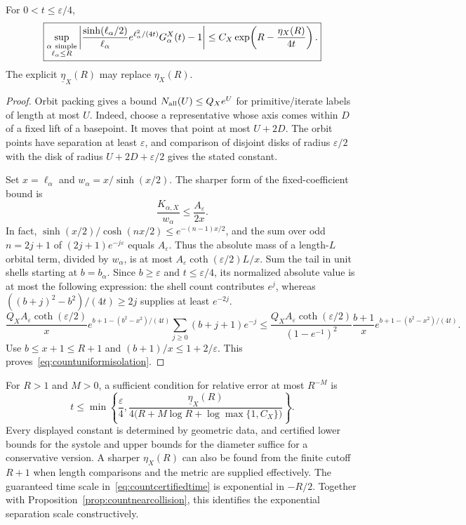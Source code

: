 \begin{proposition}
\label{prop:countuniformisolation}
For $0<t\leq\varepsilon/4$,
\begin{equation}
 \boxed{
 \sup_{\substack{\alpha\ {\rm simple}\\\ell_\alpha\leq R}}
 \left|
   \frac{\sinh(\ell_\alpha/2)}{\ell_\alpha}
   e^{\ell_\alpha^2/(4t)}G_\alpha^X(t)-1
 \right|
 \leq C_X\exp\!\left(R-\frac{\eta_X(R)}{4t}\right).
 }
 \label{eq:countuniformisolation}
\end{equation}
The explicit $\underline\eta_X(R)$ may replace $\eta_X(R)$.
\end{proposition}

\begin{proof}
Orbit packing gives a bound $N_{\rm all}(U)\leq Q_Xe^U$
for primitive/iterate labels of length at most $U$.
Indeed, choose a representative whose axis comes within $D$ of
a fixed lift of a basepoint. It moves that point at most $U+2D$.
The orbit points have separation at least $\varepsilon$, and
comparison of disjoint disks of radius $\varepsilon/2$ with the
disk of radius $U+2D+\varepsilon/2$ gives the stated constant.

Set $x=\ell_\alpha$ and $w_\alpha=x/\sinh(x/2)$.
The sharper form of the fixed-coefficient bound is
\[
 \frac{K_{\alpha,X}}{w_\alpha}
 \leq\frac{A_\varepsilon}{2x}.
\]
In fact,
$\sinh(x/2)/\cosh(nx/2)\leq e^{-(n-1)x/2}$, and the sum
over odd $n=2j+1$ of
$(2j+1)e^{-j\varepsilon}$ equals $A_\varepsilon$.
Thus the absolute mass of a length-$L$ orbital term, divided by
$w_\alpha$, is at most
$A_\varepsilon\coth(\varepsilon/2)L/x$.
Sum the tail in unit shells starting at $b=b_\alpha$.
Since $b\geq\varepsilon$ and $t\leq\varepsilon/4$, its normalized
absolute value is at most the following expression: the shell
count contributes $e^j$, whereas
$((b+j)^2-b^2)/(4t)\geq2j$ supplies at least $e^{-2j}$.
\[
 \frac{Q_X A_\varepsilon\coth(\varepsilon/2)}{x}
 e^{b+1-(b^2-x^2)/(4t)}
 \sum_{j\geq0}(b+j+1)e^{-j}
 \leq
 \frac{Q_X A_\varepsilon\coth(\varepsilon/2)}{(1-e^{-1})^2}
 \frac{b+1}{x}e^{b+1-(b^2-x^2)/(4t)}.
\]
Use $b\leq x+1\leq R+1$ and $(b+1)/x\leq1+2/\varepsilon$.
This proves~\eqref{eq:countuniformisolation}.
\end{proof}

For $R>1$ and $M>0$, a sufficient condition for relative error
at most $R^{-M}$ is
\begin{equation}
 t\leq\min\left\{\frac\varepsilon4,
 \frac{\underline\eta_X(R)}
      {4\bigl(R+M\log R+\log\max\{1,C_X\}\bigr)}\right\}.
 \label{eq:countcertifiedtime}
\end{equation}
Every displayed constant is determined by geometric data, and
certified lower bounds for the systole and upper bounds for the
diameter suffice for a conservative version. A sharper $\eta_X(R)$
can also be found from the finite cutoff $R+1$ when length
comparisons and the metric are supplied effectively. The guaranteed
time scale in~\eqref{eq:countcertifiedtime} is exponential in $-R/2$.
Together with Proposition~\ref{prop:countnearcollision}, this
identifies the exponential separation scale constructively.

